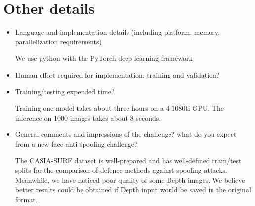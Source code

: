 \documentclass{article}
\begin{document}
\section{Other details}

\begin{itemize}
\item Language and implementation details (including platform, memory, parallelization requirements)

We use python with the PyTorch deep learning framework

\item Human effort required for implementation, training and validation?
\item Training/testing expended time?

Training one model takes about three hours on a 4 1080ti GPU. The inference on 1000 images takes about 8 seconds.

\item General comments and impressions of the challenge? what do you expect from a new face anti-spoofing challenge?

The CASIA-SURF dataset is well-prepared and has well-defined train/test splits for the comparison of defence methods against spoofing attacks. 
Meanwhile, we have noticed poor quality of some Depth images. We believe better results could be obtained if Depth input would be saved in the original format.


\end{itemize}
\end{document}

